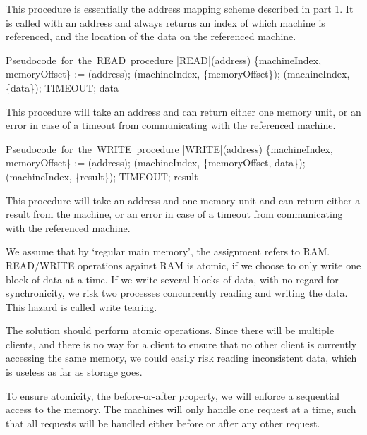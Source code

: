 \documentclass[11pt]{article}
\begin{document}
This procedure is essentially the address mapping scheme described in part 1. It is called with an address and always returns an index of which machine is referenced, and the location of the data on the referenced machine.

\begin{program}
\mbox{Pseudocode for the READ procedure}
        \PROC |READ|(address) \BODY
               \{machineIndex, memoryOffset\} :=  (address);
                (machineIndex, \{memoryOffset\});
                \;  (machineIndex, \{data\});
                \; TIMEOUT;
                \; data \ENDPROC
\end{program}

This procedure will take an address and can return either one memory unit, or an error in case of a timeout from communicating with the referenced machine.
    
\begin{program}
\mbox{Pseudocode for the WRITE procedure}
        \PROC |WRITE|(address) \BODY
               \{machineIndex, memoryOffset\} :=  (address);
                (machineIndex, \{memoryOffset, data\});
                \;  (machineIndex, \{result\});
               \; TIMEOUT;
                \; result \ENDPROC
\end{program}


This procedure will take an address and one memory unit and can return either a
result from the machine, or an error in case of a timeout from communicating
with the referenced machine.


We assume that by ‘regular main memory’, the assignment refers to RAM. READ/WRITE operations against RAM is atomic, if we choose to only write one block of data at a time. If we write several blocks of data, with no regard for synchronicity, we risk two processes concurrently reading and writing the data. This hazard is called write tearing. 

The solution should perform atomic operations. Since there will be multiple clients, and there is no way for a client to ensure that no other client is currently accessing the same memory, we could easily risk reading inconsistent data, which is useless as far as storage goes. 

To ensure atomicity, the before-or-after property, we will enforce a sequential access to the memory. The machines will only handle one request at a time, such that all requests will be handled either before or after any other request. 
\end{document}
